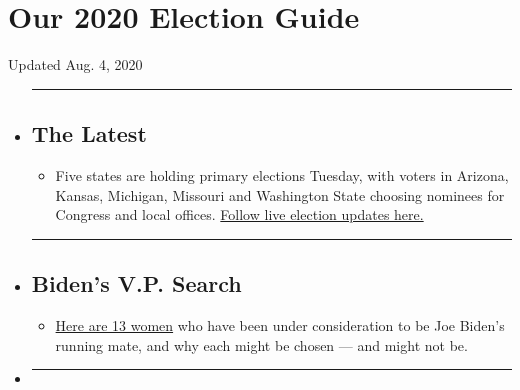 \hypertarget{our-2020-election-guide}{%
\section{Our 2020 Election Guide}\label{our-2020-election-guide}}

Updated Aug. 4, 2020

\begin{itemize}
\item
  \begin{center}\rule{0.5\linewidth}{\linethickness}\end{center}

  \hypertarget{the-latest}{%
  \subsection{The Latest}\label{the-latest}}

  \begin{itemize}
  \tightlist
  \item
    Five states are holding primary elections Tuesday, with voters in
    Arizona, Kansas, Michigan, Missouri and Washington State choosing
    nominees for Congress and local offices.
    \href{https://www.nytimes3xbfgragh.onion/2020/08/04/us/elections/primary-election-michigan-arizona-kansas.html?action=click\&pgtype=Article\&state=default\&region=BELOW_MAIN_CONTENT\&context=storylines_guide}{Follow
    live election updates here.}
  \end{itemize}
\item
  \begin{center}\rule{0.5\linewidth}{\linethickness}\end{center}

  \hypertarget{bidens-vp-search}{%
  \subsection{Biden's V.P. Search}\label{bidens-vp-search}}

  \begin{itemize}
  \tightlist
  \item
    \href{https://www.nytimes3xbfgragh.onion/article/biden-vice-president-2020.html?action=click\&pgtype=Article\&state=default\&region=BELOW_MAIN_CONTENT\&context=storylines_guide}{Here
    are 13 women} who have been under consideration to be Joe Biden's
    running mate, and why each might be chosen --- and might not be.
  \end{itemize}
\item
  \begin{center}\rule{0.5\linewidth}{\linethickness}\end{center}


\end{itemize}
